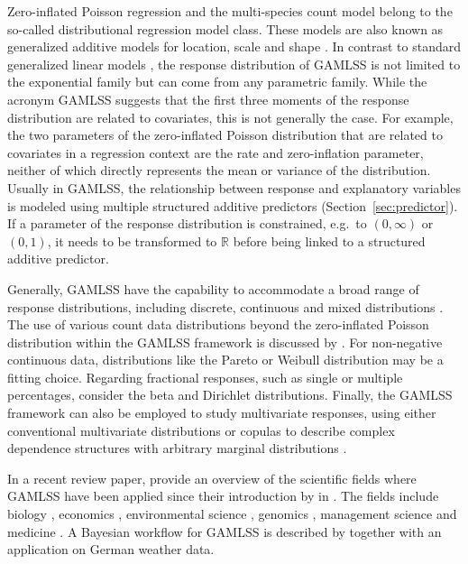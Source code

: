 \documentclass{article}
\newcommand{\IR}{\mathbb{R}}
\begin{document}
Zero-inflated Poisson regression and the multi-species count model belong to the so-called distributional regression model class. These models are also known as generalized additive models for location, scale and shape \citep[GAMLSS,][]{rigbyGeneralized2005}. In contrast to standard generalized linear models \citep[GLMs,][]{nelderGeneralized1972}, the response distribution of GAMLSS is not limited to the exponential family but can come from any parametric family. While the acronym GAMLSS suggests that the first three moments of the response distribution are related to covariates, this is not generally the case. For example, the two parameters of the zero-inflated Poisson distribution that are related to covariates in a regression context are the rate and zero-inflation parameter, neither of which directly represents the mean or variance of the distribution. Usually in GAMLSS, the relationship between response and explanatory variables is modeled using multiple structured additive predictors (Section~\ref{sec:predictor}). If a parameter of the response distribution is constrained, e.g.~to $(0, \infty)$ or $(0, 1)$, it needs to be transformed to $\IR$ before being linked to a structured additive predictor.

Generally, GAMLSS have the capability to accommodate a broad range of response distributions, including discrete, continuous and mixed distributions \citep{rigbyDistributions2019}. The use of various count data distributions beyond the zero-inflated Poisson distribution within the GAMLSS framework is discussed by \citet{kleinCount2015}. For non-negative continuous data, distributions like the Pareto or Weibull distribution may be a fitting choice. Regarding fractional responses, such as single or multiple percentages, \citet{kleinMultivariate2015} consider the beta and Dirichlet distributions. Finally, the GAMLSS framework can also be employed to study multivariate responses, using either conventional multivariate distributions \citep{michaelisBayesian2018} or copulas to describe complex dependence structures with arbitrary marginal distributions \citep{kleinSimultaneous2016}.

In a recent review paper, \citet{stasinopoulosGAMLSS2018} provide an overview of the scientific fields where GAMLSS have been applied since their introduction by \citeauthor{rigbyGeneralized2005} in \citeyear{rigbyGeneralized2005}. The fields include biology \citep{hawkinsIncreasing2013}, economics \citep{voudourisEconomic2015}, environmental science \citep{villariniFlood2009}, genomics \citep{khondokerComparison2007}, management science \citep{budgeEmpirical2010} and medicine \citep{rodriguesCOM2009}. A Bayesian workflow for GAMLSS is described by \citet{umlaufPrimer2018} together with an application on German weather data.
\end{document}
